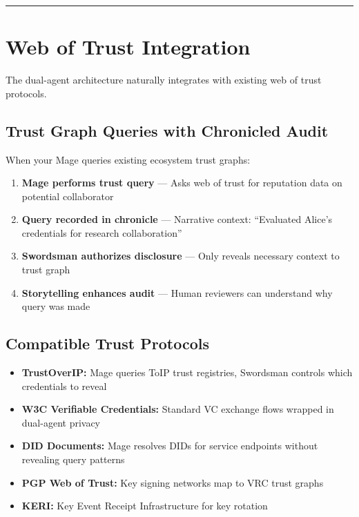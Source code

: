 \documentclass[
  11pt,
]{article}
\begin{document}
\begin{center}\rule{0.5\linewidth}{0.5pt}\end{center}

\section{Web of Trust Integration}\label{web-of-trust-integration}

The dual-agent architecture naturally integrates with existing web of
trust protocols.

\subsection{Trust Graph Queries with Chronicled
Audit}\label{trust-graph-queries-with-chronicled-audit}

When your Mage queries existing ecosystem trust graphs:

\begin{enumerate}
\def\labelenumi{\arabic{enumi}.}
\item
  \textbf{Mage performs trust query} --- Asks web of trust for
  reputation data on potential collaborator
\item
  \textbf{Query recorded in chronicle} --- Narrative context:
  ``Evaluated Alice's credentials for research collaboration''
\item
  \textbf{Swordsman authorizes disclosure} --- Only reveals necessary
  context to trust graph
\item
  \textbf{Storytelling enhances audit} --- Human reviewers can
  understand why query was made
\end{enumerate}

\subsection{Compatible Trust
Protocols}\label{compatible-trust-protocols}

\begin{itemize}
\item
  \textbf{TrustOverIP:} Mage queries ToIP trust registries, Swordsman
  controls which credentials to reveal
\item
  \textbf{W3C Verifiable Credentials:} Standard VC exchange flows
  wrapped in dual-agent privacy
\item
  \textbf{DID Documents:} Mage resolves DIDs for service endpoints
  without revealing query patterns
\item
  \textbf{PGP Web of Trust:} Key signing networks map to VRC trust
  graphs
\item
  \textbf{KERI:} Key Event Receipt Infrastructure for key rotation
\end{itemize}
\end{document}
